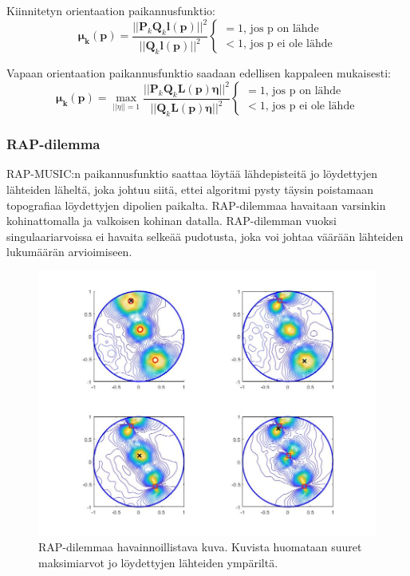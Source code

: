 Kiinnitetyn orientaation paikannusfunktio:
\begin{equation}
    \mathbf{\mu_k(p)} = \frac{||\mathbf{P}_k\mathbf{Q}_k\mathbf{l(p)}||^2}{||\mathbf{Q}_k\mathbf{l(p)}||^2}
    \begin{cases}
    =1\text{, jos p on lähde}\\
    <1\text{, jos p ei ole lähde}
     \end{cases}
\end{equation}

Vapaan orientaation paikannusfunktio saadaan edellisen kappaleen mukaisesti:
\begin{equation}
    \mathbf{\mu_k(p)} = \max_{||\eta||=1} \frac{||\mathbf{P}_k\mathbf{Q}_k\mathbf{L(p)\eta}||^2}{||\mathbf{Q}_k\mathbf{L(p)\eta}||^2}
    \begin{cases}
    =1\text{, jos p on lähde}\\
    <1\text{, jos p ei ole lähde}
     \end{cases}
\end{equation}


\subsubsection{RAP-dilemma}
RAP-MUSIC:n paikannusfunktio saattaa löytää lähdepisteitä jo löydettyjen lähteiden läheltä, joka johtuu siitä, ettei algoritmi pysty täysin poistamaan topografiaa löydettyjen dipolien paikalta. RAP-dilemmaa havaitaan varsinkin kohinattomalla ja valkoisen kohinan datalla. RAP-dilemman vuoksi singulaariarvoissa ei havaita selkeää pudotusta, joka voi johtaa väärään lähteiden lukumäärän arvioimiseen. \citep{Makela2018TruncatedLocalization}


\clearpage

\begin{figure}[ht]
    \centering
    \includegraphics[width=\textwidth]{rapdilemma.jpg}
    \caption{RAP-dilemmaa havainnoillistava kuva. Kuvista huomataan suuret maksimiarvot jo löydettyjen lähteiden ympäriltä.}
    \label{fig:dilemma}
\end{figure}